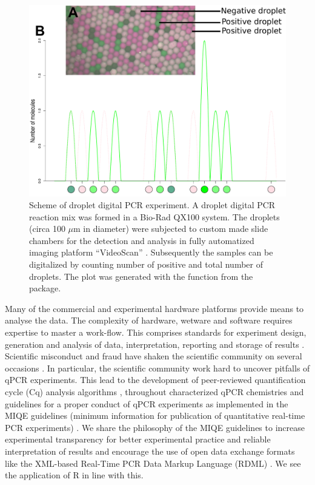 \begin{figure}[htbp]
  \centering
  \includegraphics[clip=true, width=14cm]{figures/dpcR_sim.pdf}
  \caption{Scheme of droplet digital PCR experiment.  A droplet 
digital PCR reaction mix was formed in a Bio-Rad QX100 system. The droplets 
(circa 100 $\mu$m in diameter) were subjected to custom made slide chambers for 
the detection and analysis in fully automatized imaging platform ``VideoScan'' 
\citep{rodiger_highly_2013}.  Subsequently the samples can be 
digitalized by counting number of positive and total number of droplets. The 
plot was generated with the  function from the  
package.}
\label{figure:dpcR_sim}
\end{figure}

Many of the commercial and experimental hardware platforms provide means to 
analyse the data. The complexity of hardware, wetware and software requires 
expertise to master a work-flow. This comprises standards for experiment design, 
generation and analysis of data, interpretation, reporting and storage of 
results \citep{huggett_BDQ_2014}. Scientific misconduct and fraud have shaken 
the scientific community on several occasions \citep{fang_2012}. In particular, 
the scientific community work hard to uncover pitfalls of qPCR experiments. This 
lead to the development of peer-reviewed quantification cycle (Cq) analysis 
algorithms \citep{ruijter_2013}, throughout characterized qPCR chemistries 
\citep{ruijter_2014} and guidelines for a proper conduct of qPCR experiments as 
implemented in the MIQE guidelines (minimum information for publication of 
quantitative real-time PCR experiments) \citep{bustin_miqe_2009, huggett_2013}. 
We share the philosophy of the MIQE guidelines to increase experimental 
transparency for better experimental practice and reliable interpretation of 
results and encourage the use of open data exchange formats like the XML-based 
Real-Time PCR Data Markup Language (RDML) \citep{lefever_2009}. We see the 
application of R in line with this. 

